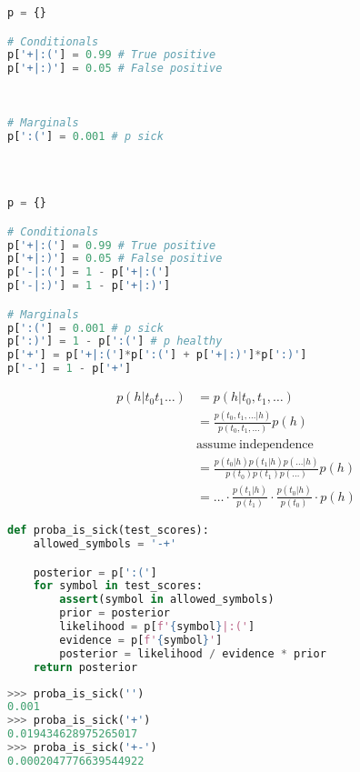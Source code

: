 \documentclass[usenames,dvipsnames,table]{beamer}
\begin{document}
\begin{frame}[fragile]
\begin{lstlisting}[language=Python]
p = {}

# Conditionals
p['+|:('] = 0.99 # True positive
p['+|:)'] = 0.05 # False positive
 
 
 
# Marginals
p[':('] = 0.001 # p sick
 
 
 
\end{lstlisting}
\end{frame}

\begin{frame}[fragile]
\begin{lstlisting}[language=Python]
p = {}

# Conditionals
p['+|:('] = 0.99 # True positive
p['+|:)'] = 0.05 # False positive
p['-|:('] = 1 - p['+|:(']
p['-|:)'] = 1 - p['+|:)']

# Marginals
p[':('] = 0.001 # p sick
p[':)'] = 1 - p[':('] # p healthy
p['+'] = p['+|:(']*p[':('] + p['+|:)']*p[':)']
p['-'] = 1 - p['+']
\end{lstlisting}
\end{frame}

\begin{frame}
\begin{align*}
p(h|t_0t_1\ldots) &= p(h|t_0, t_1, \ldots)\\
                  &= \frac{p(t_0, t_1, \ldots|h)}{p(t_0, t_1, \ldots)}p(h) \\
                  &\mathrm{assume\ independence}\\
                  &= \frac{p(t_0|h) p(t_1|h) p(\ldots|h)}{p(t_0)p(t_1)p(\ldots)}p(h)\\
                  &= \ldots \cdot \frac{p(t_1|h)}{p(t_1)}
                            \cdot \frac{p(t_0|h)}{p(t_0)}
                            \cdot p(h)
\end{align*}
\end{frame}

\begin{frame}[fragile]
\begin{lstlisting}[language=Python]
def proba_is_sick(test_scores):
    allowed_symbols = '-+'

    posterior = p[':(']
    for symbol in test_scores:
        assert(symbol in allowed_symbols)
        prior = posterior
        likelihood = p[f'{symbol}|:(']
        evidence = p[f'{symbol}']
        posterior = likelihood / evidence * prior
    return posterior
\end{lstlisting}
\end{frame}

\begin{frame}[fragile]
\begin{lstlisting}[language=Python]
>>> proba_is_sick('')
0.001
>>> proba_is_sick('+')
0.019434628975265017
>>> proba_is_sick('+-')
0.0002047776639544922
\end{lstlisting}
\end{frame}
\end{document}
